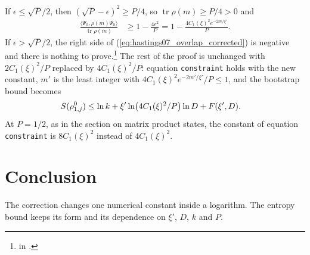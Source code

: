 \documentclass{article}
\begin{document}
If $\epsilon\le\sqrt P/2$, then $(\sqrt P-\epsilon)^2\ge P/4$, so
$\operatorname{tr}\rho(m)\ge P/4>0$ and
\begin{align}
    \frac{\langle\Psi_0,\rho(m)\Psi_0\rangle}{\operatorname{tr}\rho(m)}
     & \ge1-\frac{4\epsilon^2}{P}=1-\frac{4C_1(\xi)^2e^{-2m/\xi'}}{P}.
    \label{eq:hastings07_overlap_corrected}
\end{align}
If $\epsilon>\sqrt P/2$, the right side of
(\ref{eq:hastings07_overlap_corrected}) is negative and there is nothing to
prove.\footnote{
    in .}
The rest of the proof is unchanged with $2C_1(\xi)^2/P$ replaced by
$4C_1(\xi)^2/P$: equation \texttt{constraint} holds with the new constant, $m'$
is the least integer with $4C_1(\xi)^2e^{-2m'/\xi'}/P\le1$, and the bootstrap
bound becomes
\begin{align}
    S(\rho^0_{1,j})
     & \le\ln k+\xi'\ln\bigl(4C_1(\xi)^2/P\bigr)\ln D+F(\xi',D).
    \notag
\end{align}
At $P=1/2$, as in the section on matrix product states, the constant of
equation \texttt{constraint} is $8C_1(\xi)^2$ instead of $4C_1(\xi)^2$.

\section{Conclusion}

The correction changes one numerical constant inside a logarithm. The entropy
bound keeps its form and its dependence on $\xi'$, $D$, $k$ and $P$.



\end{document}
